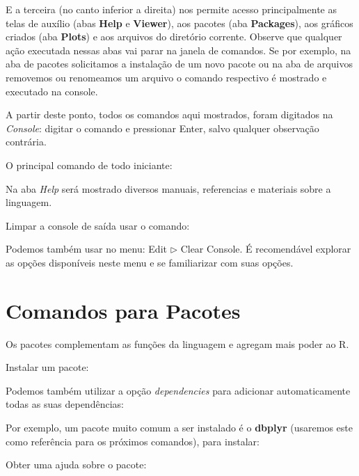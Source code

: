 \documentclass[a4paper,11pt]{article}
\begin{document}
E a terceira (no canto inferior a direita) nos permite acesso principalmente as telas de auxílio (abas \textbf{Help} e \textbf{Viewer}), aos pacotes (aba \textbf{Packages}), aos gráficos criados (aba \textbf{Plots}) e aos arquivos do diretório corrente. Observe que qualquer ação executada nessas abas vai parar na janela de comandos. Se por exemplo, na aba de pacotes solicitamos a instalação de um novo pacote ou na aba de arquivos removemos ou renomeamos um arquivo o comando respectivo é mostrado e executado na console.

\begin{theo}[]{}
A partir deste ponto, todos os comandos aqui mostrados, foram digitados na \textit{Console}: digitar o comando e pressionar Enter, salvo qualquer observação contrária. 
\end{theo}

O principal comando de todo iniciante: \\

Na aba \textit{Help} será mostrado diversos manuais, referencias e materiais sobre a linguagem.

Limpar a console de saída usar o comando: \\

Podemos também usar no menu: Edit $\triangleright$ Clear Console. É recomendável explorar as opções disponíveis neste menu e se familiarizar com suas opções.

\section{Comandos para Pacotes}
Os pacotes complementam as funções da linguagem e agregam mais poder ao R. 

Instalar um pacote: \\

Podemos também utilizar a opção \textit{dependencies} para adicionar automaticamente todas as suas dependências: \\

Por exemplo, um pacote muito comum a ser instalado é o \textbf{dbplyr} (usaremos este como referência para os próximos comandos), para instalar: \\

Obter uma ajuda sobre o pacote: \\
\end{document}
